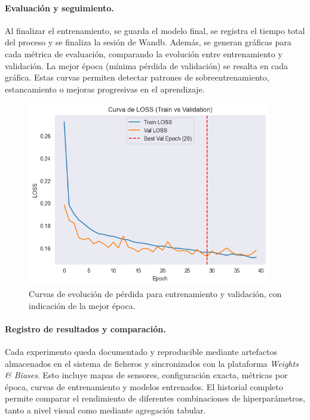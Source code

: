\paragraph{Evaluación y seguimiento.}  
Al finalizar el entrenamiento, se guarda el modelo final, se registra el tiempo total del proceso y se finaliza la sesión de Wandb. Además, se generan gráficas para cada métrica de evaluación, comparando la evolución entre entrenamiento y validación. La mejor época (mínima pérdida de validación) se resalta en cada gráfica. Estas curvas permiten detectar patrones de sobreentrenamiento, estancamiento o mejoras progresivas en el aprendizaje.

\begin{figure}[H]
	\centering
	\includegraphics[width=0.95\textwidth]{includes/cap5/loss_curve_example.png}
	\caption{Curvas de evolución de pérdida para entrenamiento y validación, con indicación de la mejor época.}
	\label{fig:loss_curve_example}
\end{figure}

\paragraph{Registro de resultados y comparación.}  
Cada experimento queda documentado y reproducible mediante artefactos almacenados en el sistema de ficheros y sincronizados con la plataforma \textit{Weights \& Biases}. Esto incluye mapas de sensores, configuración exacta, métricas por época, curvas de entrenamiento y modelos entrenados. El historial completo permite comparar el rendimiento de diferentes combinaciones de hiperparámetros, tanto a nivel visual como mediante agregación tabular.


